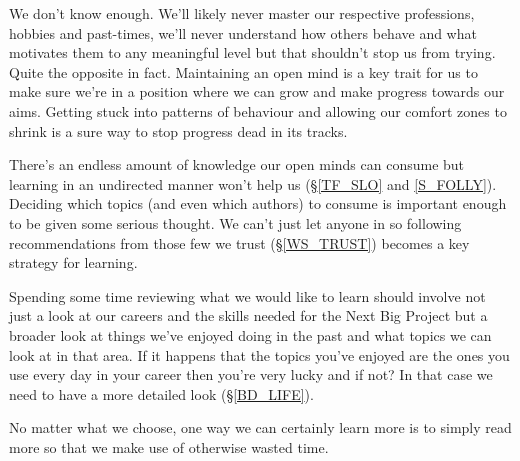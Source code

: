 \cleardoublepage
{\small

We don't know enough. We'll likely never master our respective professions, hobbies and past-times, we'll never understand how others behave and what motivates them to any meaningful level but that shouldn't stop us from trying. Quite the opposite in fact. Maintaining an open mind is a key trait for us to make sure we're in a position where we can grow and make progress towards our aims. Getting stuck into patterns of behaviour and allowing our comfort zones to shrink is a sure way to stop progress dead in its tracks.

There's an endless amount of knowledge our open minds can consume but learning in an undirected manner won't help us (\S  \ref{TF_SLO} and \ref{S_FOLLY}). 
Deciding which topics (and even which authors) to consume is important enough to be given some serious thought. We can't just let anyone in so following recommendations from those few we trust (\S \ref{WS_TRUST}) becomes a key strategy for learning.

Spending some time reviewing what we would like to learn should involve not just a look at our careers and the skills needed for the Next Big Project but a broader look at things we've enjoyed doing in the past and what topics we can look at in that area. If it happens that the topics you've enjoyed are the ones you use every day in your career then you're very lucky and if not? In that case we need to have a more detailed look (\S \ref{BD_LIFE}).

No matter what we choose, one way we can certainly learn more is to simply read more so that we make use of otherwise wasted time. 

}

